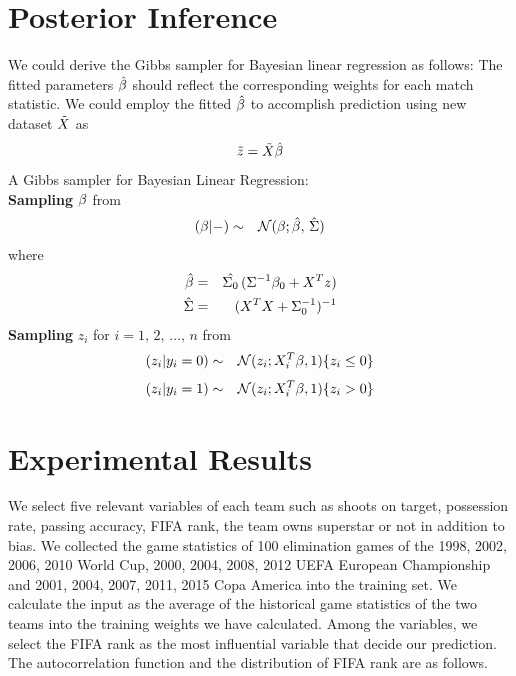 \documentclass{article}
\begin{document}
\section{Posterior Inference}

We could derive the Gibbs sampler for Bayesian linear regression as follows:
The fitted parameters $\hat{\boldmath{\beta}}$ should reflect the corresponding weights for each match statistic. We could employ the fitted $\hat{\boldmath{\beta}}$ to accomplish prediction using new dataset $\tilde{\boldmath{X}}$ as
\begin{equation}
\tilde{\boldmath{z}} = \tilde{\boldmath{X}} \hat{\boldmath{\beta}}
\label{eq:pred}
\end{equation}
\newline
A Gibbs sampler for Bayesian Linear Regression:
\newline \\
\textbf{Sampling} $\boldmath{\beta}$ from
\begin{eqnarray}
(\boldmath{\beta} | -) &\sim& \mathcal{N} ( \boldmath{\beta}; \boldmath{\hat{\beta} }, \, \hat{\Sigma} )
\end{eqnarray}
where
\begin{eqnarray*}
\boldmath{\hat{\beta}} &=& \hat{\Sigma_0} \, ( \Sigma^{-1} \boldmath{\beta_0} + \boldmath{X}^T \boldmath{z} ) \\
\hat{\Sigma} &=& ( \boldmath{X}^T \boldmath{X} + \Sigma_0^{-1} )^{-1}
\end{eqnarray*}
\textbf{Sampling} $z_i$ for $i = 1, \, 2, \, \ldots, \, n$ from
\begin{eqnarray}
(z_i | y_i=0) &\sim& \mathcal{N} ( z_i; X_i^T \boldmath{\beta}, 1 ) \{z_i\leq0\}
\end{eqnarray}
\begin{eqnarray}
(z_i | y_i=1) &\sim& \mathcal{N} ( z_i; X_i^T \boldmath{\beta}, 1 ) \{z_i>0\}
\end{eqnarray}

\section{Experimental Results}

We select five relevant variables of each team such as shoots on target, possession rate, passing accuracy, FIFA rank, the team owns superstar or not in addition to bias. We collected the game statistics of 100 elimination games of the 1998, 2002, 2006, 2010 World Cup, 2000, 2004, 2008, 2012 UEFA European Championship and 2001, 2004, 2007, 2011, 2015 Copa America into the training set. We calculate the input as the average of the historical game statistics of the two teams into the training weights we have calculated. Among the variables, we select the FIFA rank as the most influential variable that decide our prediction. The autocorrelation function and the distribution of FIFA rank are as follows.
\end{document}
